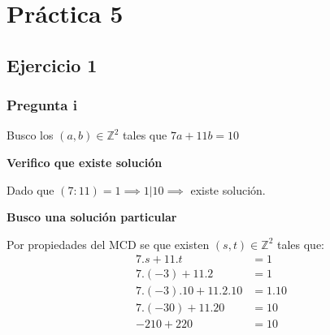 
\usepackage{caratula}
\usepackage{enumerate}
\usepackage{hyperref}
\usepackage{graphicx}
\usepackage{amsfonts}
\usepackage{enumitem}
\usepackage{amsmath}

\decimalpoint
\hypersetup{colorlinks=true, linkcolor=black, urlcolor=blue}
\setlength{\parindent}{0em}
\setlength{\parskip}{0.5em}
\setcounter{tocdepth}{2} %
\setcounter{section}{4} %
\renewcommand{\thesubsubsection}{\thesubsection.\Alph{subsubsection}}
\graphicspath{ {images/} }





\maketitle
\newpage

\tableofcontents
\newpage

\section{Práctica 5}

\subsection{Ejercicio 1}

\subsubsection{Pregunta i}

Busco los $ (a,b) \in \mathbb{Z}^2 $ tales que $ 7a+11b = 10 $

\textbf{Verifico que existe solución}

Dado que $ (7:11) = 1 \implies 1|10 \implies $ existe solución.

\textbf{Busco una solución particular}

Por propiedades del MCD se que existen $ (s,t) \in \mathbb{Z}^2 $ tales que:
\begin{align*}
    7.s + 11.t &= 1 \\
    7.(-3) + 11.2 &= 1 \\
    7.(-3).10 + 11.2.10 &= 1.10 \\
    7.(-30) + 11.20 &= 10 \\
    -210+220 &= 10 \\
\end{align*}

